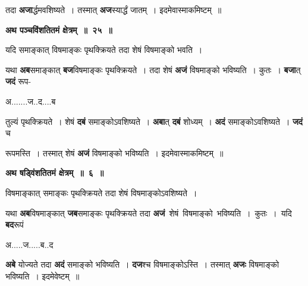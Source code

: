 \documentclass[11pt, openany]{book}
\begin{document}
\noindent  तदा \textbf{अजा}र्द्धमवशिष्यते~। तस्मात् \textbf{अज}स्यार्द्धं जातम्~। इदमेवास्माकमिष्टम्~॥
 
 \begin{center}
\textbf{\large अथ पञ्चविंशतितमं क्षेत्रम्~॥~२५~॥}
\end{center}
\vspace{2mm}

{\ab यदि समाङ्कात् विषमाङ्कः पृथक्क्रियते तदा शेषं विषमाङ्को भवति~। }

\begin{flushleft}
\begin{minipage}[t]{0.65\textwidth}
\hspace{4mm}  यथा \textbf{अब}समाङ्कात् \textbf{बज}विषमाङ्कः पृथक्क्रियते~। तदा शेषं \textbf{अजं} विषमाङ्को भविष्यति~। कुतः~। \textbf{बजा}त् \textbf{जदं} रूप-
\end{minipage} 
\hfill
\begin{minipage}[t]{0.25\textwidth}
अ.......ज..द....ब
\end{minipage}
\end{flushleft}
\vspace{-3mm}

\noindent तुल्यं पृथक्क्रियते~। शेषं \textbf{दबं} समाङ्कोऽवशिष्यते~। \textbf{अबा}त् \textbf{दबं} शोध्यम्~। \textbf{अदं} समाङ्कोऽवशिष्यते~। \textbf{जदं} च 

\newpage
\noindent रूपमस्ति~। तस्मात् शेषं \textbf{अजं} विषमाङ्को भविष्यति~। इदमेवास्माकमिष्टम्~॥ 
\vspace{2mm}

\begin{center}
\textbf{\large अथ षड्विंशतितमं क्षेत्रम्~॥~६~॥}
\end{center}

 {\ab विषमाङ्कात् समाङ्कः पृथक्क्रियते तदा शेषं विषमाङ्कोऽवशिष्यते~। }

\begin{flushleft}
\begin{minipage}[t]{0.65\textwidth}
\hspace{4mm}  यथा \textbf{अब}विषमाङ्कात् \textbf{जब}समाङ्कः पृथक्क्रियते तदा \textbf{अजं} \,शेषं  \,विषमाङ्को \,भविष्यति~। \,कुतः~। \,यदि \,\textbf{बद}रूपं 
\end{minipage} 
\hfill
\begin{minipage}[t]{0.25\textwidth}
अ.....ज.....ब..द
\end{minipage}
\end{flushleft}
\vspace{-3mm}

\noindent \textbf{अबे} योज्यते तदा \textbf{अदं} समाङ्को भविष्यति~। \textbf{दज}श्च विषमाङ्कोऽस्ति~। तस्मात् \textbf{अजः} विषमाङ्को भविष्यति~। इदमेवेष्टम्~॥ 
\vspace{2mm}
\end{document}
